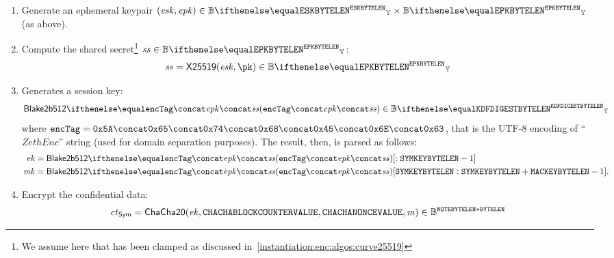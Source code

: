 \begin{enumerate}
    \item Generate an ephemeral  keypair $(\esk, \epk) \in \BBy{\eskByteLen} \times \BBy{\epkByteLen}$ (as above).
    \item Compute the shared secret\footnote{We assume here that \esk{} has been clamped as discussed in~\cref{instantiation:enc:algos:curve25519}} $\sharedSecret \in \BBy{\epkByteLen}$:
    \[
        \sharedSecret = \xscalarmult{25519}(\esk, \pk) \in \BBy{\epkByteLen}
    \]
    \item Generates a session key:
    \[
        \blake{2b512}{\encTag \concat \epk \concat \sharedSecret} \in \BBy{\kdfDigestByteLen}
    \]
    where $\encTag = \bytestyle{5A} \concat \bytestyle{65} \concat \bytestyle{74} \concat \bytestyle{68} \concat \bytestyle{45} \concat \bytestyle{6E} \concat \bytestyle{63}$, that is the UTF-8 encoding of ``$ZethEnc$'' string (used for domain separation purposes). The result, then, is parsed as follows:
    \begin{align*}
        \ek &= \blake{2b512}{\encTag \concat\epk \concat\sharedSecret}[: \symKeyByteLen-1]\\
        \mk &= \blake{2b512}{\encTag \concat\epk \concat\sharedSecret}[\symKeyByteLen: \symKeyByteLen + \macKeyByteLen-1].
    \end{align*}
    \item Encrypt the confidential data:
    \[
        \mathit{ct}_{\mathsf{Sym}} = \mathsf{ChaCha20}(\mathit{ek}, \mathtt{CHACHABLOCKCOUNTERVALUE}, \mathtt{CHACHANONCEVALUE}, \mathit{m}) \in \mathbb{B}^{\mathtt{NOTEBYTELEN} * \mathtt{BYTELEN}}
    \]


\end{enumerate}
